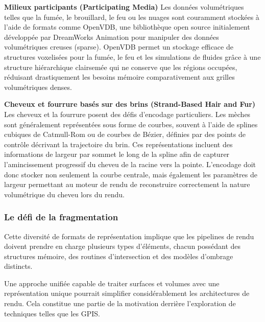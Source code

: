 \textbf{Milieux participants (Participating Media)}  
Les données volumétriques telles que la fumée, le brouillard, le feu ou les nuages sont couramment stockées à l'aide de formats comme OpenVDB, une bibliothèque open source initialement développée par DreamWorks Animation pour manipuler des données volumétriques creuses (sparse). OpenVDB permet un stockage efficace de structures voxelisées pour la fumée, le feu et les simulations de fluides grâce à une structure hiérarchique clairsemée qui ne conserve que les régions occupées, réduisant drastiquement les besoins mémoire comparativement aux grilles volumétriques denses.

\textbf{Cheveux et fourrure basés sur des brins (Strand-Based Hair and Fur)}  
Les cheveux et la fourrure posent des défis d'encodage particuliers. Les mèches sont généralement représentées sous forme de courbes, souvent à l'aide de splines cubiques de Catmull-Rom ou de courbes de Bézier, définies par des points de contrôle décrivant la trajectoire du brin. Ces représentations incluent des informations de largeur par sommet le long de la spline afin de capturer l'amincissement progressif du cheveu de la racine vers la pointe. L'encodage doit donc stocker non seulement la courbe centrale, mais également les paramètres de largeur permettant au moteur de rendu de reconstruire correctement la nature volumétrique du cheveu lors du rendu.

\subsubsection{Le d\'efi de la fragmentation}

Cette diversit\'e de formats de repr\'esentation implique que les pipelines de rendu doivent prendre en charge plusieurs types d'éléments, chacun poss\'edant des structures m\'emoire, des routines d'intersection et des mod\`eles d'ombrage distincts.

Une approche unifi\'ee capable de traiter surfaces et volumes avec une repr\'esentation unique pourrait simplifier consid\'erablement les architectures de rendu. Cela constitue une partie de la motivation derri\`ere l'exploration de techniques telles que les GPIS.

